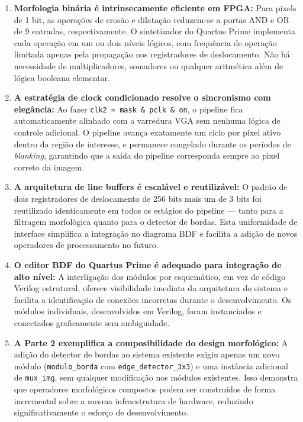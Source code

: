 \documentclass[12pt, a4paper]{article}
\begin{document}
	\begin{enumerate}
		\item \textbf{Morfologia binária é intrinsecamente eficiente em FPGA:}
		Para pixels de 1 bit, as operações de erosão e dilatação reduzem-se a portas
		AND e OR de 9 entradas, respectivamente. O sintetizador do Quartus Prime
		implementa cada operação em um ou dois níveis lógicos, com frequência de
		operação limitada apenas pela propagação nos registradores de deslocamento.
		Não há necessidade de multiplicadores, somadores ou qualquer aritmética
		além de lógica booleana elementar.
		
		\item \textbf{A estratégia de clock condicionado resolve o sincronismo com
			elegância:} Ao fazer \texttt{clk2 = mask \& pclk \& on}, o pipeline fica
		automaticamente alinhado com a varredura VGA sem nenhuma lógica de controle
		adicional. O pipeline avança exatamente um ciclo por pixel ativo dentro da
		região de interesse, e permanece congelado durante os períodos de
		\textit{blanking}, garantindo que a saída do pipeline corresponda sempre ao
		pixel correto da imagem.
		
		\item \textbf{A arquitetura de line buffers é escalável e reutilizável:}
		O padrão de dois registradores de deslocamento de 256 bits mais um de 3 bits
		foi reutilizado identicamente em todos os estágios do pipeline --- tanto para
		a filtragem morfológica quanto para o detector de bordas. Esta uniformidade
		de interface simplifica a integração no diagrama BDF e facilita a adição de
		novos operadores de processamento no futuro.
		
		\item \textbf{O editor BDF do Quartus Prime é adequado para integração de
			alto nível:} A interligação dos módulos por esquemático, em vez de código
		Verilog estrutural, oferece visibilidade imediata da arquitetura do sistema
		e facilita a identificação de conexões incorretas durante o desenvolvimento.
		Os módulos individuais, desenvolvidos em Verilog, foram instanciados e
		conectados graficamente sem ambiguidade.
		
		\item \textbf{A Parte 2 exemplifica a composibilidade do design morfológico:}
		A adição do detector de bordas ao sistema existente exigiu apenas um novo
		módulo (\texttt{modulo\_borda} com \texttt{edge\_detector\_3x3}) e uma
		instância adicional de \texttt{mux\_img}, sem qualquer modificação nos
		módulos existentes. Isso demonstra que operadores morfológicos compostos
		podem ser construídos de forma incremental sobre a mesma infraestrutura de
		hardware, reduzindo significativamente o esforço de desenvolvimento.
	\end{enumerate}
	
\end{document}
